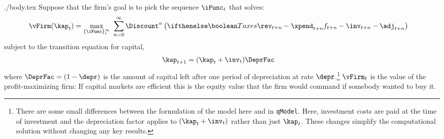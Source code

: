 \documentclass{handout}
\begin{document}
\begin{verbatimwrite}{./body.tex}
Suppose that the firm's goal is to pick the sequence $\iFunc_{t}$ that solves:
\begin{equation}\begin{gathered}\begin{aligned}
  \vFirm(\kap_{t}) & =  \max_{\{\iFunc\}_{t}^{\infty}}~\sum_{n=0}^{\infty} \Discount^{n} \left(\ifTax{\rev_{t+n}-\xpend_{t+n}}{f_{t+n}-\inv_{t+n}-\adj_{t+n}}\right)
\end{aligned}\end{gathered}\end{equation}
subject to the transition equation for capital,
\begin{equation}\begin{gathered}\begin{aligned}
  \kap_{t+1} & =  (\kap_{t}+\inv_{t})\DeprFac \label{eq:kAccum}
\end{aligned}\end{gathered}\end{equation}
where $\DeprFac = (1-\depr)$ is the amount of capital left after one
period of depreciation at rate $\depr$.\footnote{There are some small
  differences between the formulation of the model here and in
  \texttt{qModel}.  Here, investment costs are paid at the time of
  investment and the depreciation factor applies to $(\kap_{t}+\inv_{t})$
  rather than just $\kap_{t}$. These changes simplify the computational
  solution without changing any key results.}  $\vFirm_{t}$ is the
value of the profit-maximizing firm: If capital markets are efficient
this is the equity value that the firm would command if somebody
wanted to buy it.


\end{verbatimwrite}
\end{document}
